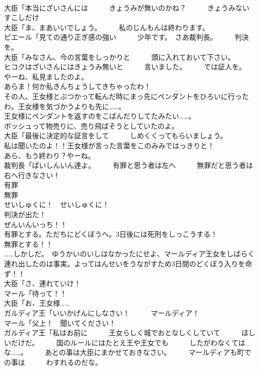 \documentclass[8pt]{extreport}
\begin{document}
\begin{CJK}{UTF8}{min}
\\	大臣「本当にざいさんには　　　きょうみが無いのかね？　　　きょうみない　　　すこしだけ	
\\	大臣「ま、まあいいでしょう。　　　私のじんもんは終わります。	
\\	ピエール「見ての通り正ぎ感の強い　　　少年です。　さあ裁判長。　　　判決を。	
\\	大臣「みなさん、今の言葉をしっかりと　　　頭に入れておいて下さい。　　　ヒコクはざいさんにはきょうみ無いと　　　言いました。　　　では証人を。	
\\	やーね、私見ましたのよ。	
\\	あらま！何か私きんちょうしてきちゃったわ！	
\\	その人、王女様とぶつかって転んだ時にまっ先にペンダントをひろいに行ったわ。王女様を気づかうよりも先に……。	
\\	王女様にペンダントを返すのをこばんだりしてたみたい……。	
\\	ボッシュって物売りに、売り飛ばそうとしていたのよ。	
\\	大臣「最後に決定的な証言をして　　　しめくくってもらいましょう。	
\\	私は聞いたのよ！！王女様が言った言葉をこのみみではっきりと！	
\\	あら、もう終わり？やーね。	
\\	裁判長「ばいしんいん達よ。　　　有罪と思う者は左へ　　　無罪だと思う者は右へ行きなさい！	
\\	有罪	
\\	無罪	
\\	せいしゅくに！　せいしゅくに！	
\\	判決が出た！	
\\	ぜんいんいっち！！	
\\	有罪とする。ただちにどくぼうへ。3日後には死刑をしっこうする！	
\\	無罪とする！！	
\\	……しかしだ。　ゆうかいのいしはなかったにせよ、マールディア王女をしばらく連れ出したのは事実。よってはんせいをうながすため3日間のどくぼう入りを命ず！！	
\\	大臣「さ、連れていけ！	
\\	マール「待って！！	
\\	大臣「お、王女様……	
\\	ガルディア王「いいかげんにしなさい！　　　マールディア！	
\\	マール「父上！　聞いてください！	
\\	ガルディア王「私はお前に　　　王女らしく城でおとなしくしていて　　　ほしいだけだ。　　　国のルールにはたとえ王や王女でも　　　したがわなくてはな……。　　　あとの事は大臣にまかせておきなさい。　　　マールディアも町での事は　　　わすれるのだな。	

\end{CJK}
\end{document}
